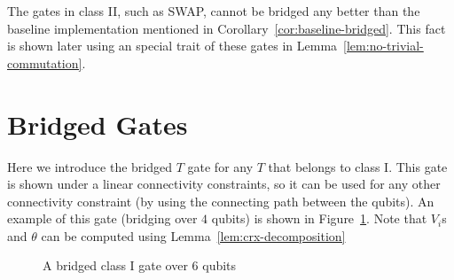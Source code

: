 The gates in class II, such as SWAP, cannot be bridged any better than the baseline implementation mentioned in Corollary~\ref{cor:baseline-bridged}. This fact is shown later using an special trait of these gates in Lemma~\ref{lem:no-trivial-commutation}. 

\section{Bridged Gates}

Here we introduce the bridged $T$ gate for any $T$ that belongs to class I. This gate is shown under a linear connectivity constraints, so it can be used for any other connectivity constraint (by using the connecting path between the qubits). An example of this gate (bridging over $4$ qubits) is shown in Figure~\ref{fig:bridged-class-i}. Note that $V_i$s and $\theta$ can be computed using Lemma~\ref{lem:crx-decomposition}

\begin{figure}[h!]
  \label{fig:bridged-class-i}
  \centering
  \caption{A bridged class I gate over 6 qubits}
\end{figure}
  
